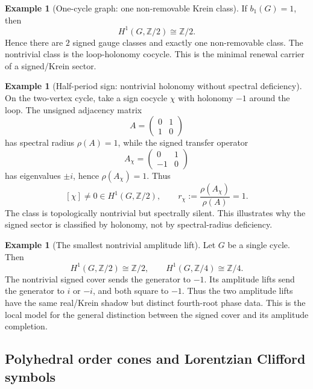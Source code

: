 \documentclass[11pt]{article}
\theoremstyle{definition}
\newtheorem{example}[theorem]{Example}
\theoremstyle{remark}
\newcommand{\Z}{\mathbb{Z}}
\newcommand{\Ztwo}{\mathbb{Z}/2}
\newcommand{\Zfour}{\mathbb{Z}/4}
\begin{document}
\begin{example}[One-cycle graph: one non-removable Krein class]
\label{ex:one-cycle}
If \(b_1(G)=1\), then
\[
  H^1(G,\Z/2)\cong \Z/2 .
\]
Hence there are \(2\) signed gauge classes and exactly one non-removable class.
The nontrivial class is the loop-holonomy cocycle.  This is the minimal renewal
carrier of a signed/Krein sector.
\end{example}

\begin{example}[Half-period sign: nontrivial holonomy without spectral deficiency]
\label{ex:half-period}
On the two-vertex cycle, take a sign cocycle \(\chi\) with holonomy \(-1\) around
the loop.  The unsigned adjacency matrix
\[
  A=\begin{pmatrix}0&1\\1&0\end{pmatrix}
\]
has spectral radius \(\rho(A)=1\), while the signed transfer operator
\[
  A_\chi=\begin{pmatrix}0&1\\-1&0\end{pmatrix}
\]
has eigenvalues \(\pm i\), hence \(\rho(A_\chi)=1\).  Thus
\[
  [\chi]\neq0\in H^1(G,\Z/2),
  \qquad
  r_\chi:=\frac{\rho(A_\chi)}{\rho(A)}=1 .
\]
The class is topologically nontrivial but spectrally silent.  This illustrates
why the signed sector is classified by holonomy, not by spectral-radius
deficiency.
\end{example}

\begin{example}[The smallest nontrivial amplitude lift]
\label{ex:z4-smallest-lift}
Let \(G\) be a single cycle.  Then
\[
  H^1(G,\Ztwo)\cong\Ztwo,
  \qquad
  H^1(G,\Zfour)\cong\Zfour .
\]
The nontrivial signed cover sends the generator to \(-1\).  Its amplitude lifts
send the generator to \(i\) or \(-i\), and both square to \(-1\).  Thus the two
amplitude lifts have the same real/Krein shadow but distinct fourth-root phase
data.  This is the local model for the general distinction between the signed
cover and its amplitude completion.
\end{example}

\subsection{Polyhedral order cones and Lorentzian Clifford symbols}
\label{subsec:examples-continuum}
\end{document}
